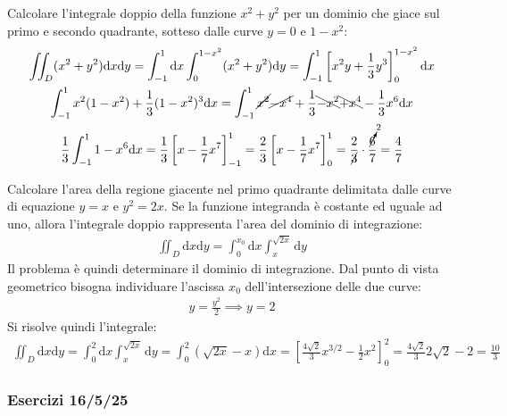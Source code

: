 \documentclass{article}
\newcommand{\df}{\mathrm{d}}
\numberwithin{equation}{subsection}
\begin{document}
Calcolare l'integrale doppio della funzione $x^2+y^2$ per un dominio che giace sul primo e secondo quadrante, sotteso dalle curve $y=0$ e $1-x^2$:
\begin{gather*}
    \iint_D(x^2+y^2)\df x\df y=\int_{-1}^1\df x\int_0^{1-x^2}(x^2+y^2)\df y=\int_{-1}^1\left[x^2y+\frac{1}{3}y^3\right]_0^{1-x^2}\df x\\
    \int_{-1}^1x^2(1-x^2)+\frac{1}{3}(1-x^2)^3\df x=
    \int_{-1}^1\cancel{x^2}\cancel{-x^4}+\frac{1}{3}\bcancel{-x^2}\bcancel{+x^4}-\frac{1}{3}x^6\df x\\
    \frac{1}{3}\int_{-1}^11-x^6\df x=\frac{1}{3}\left[x-\frac{1}{7}x^7\right]_{-1}^1=\frac{2}{3}\left[x-\frac{1}{7}x^7\right]_0^1=\frac{2}{\cancel{3}}\cdot\frac{\cancelto{2}{6}}{7}=\frac{4}{7}
\end{gather*}


Calcolare l'area della regione giacente nel primo quadrante delimitata dalle curve di equazione $y=x$ e $y^2=2x$. Se la funzione integranda è costante ed uguale ad uno, allora l'integrale doppio rappresenta l'area del dominio di integrazione:
\begin{gather*}
    \iint_D\df x\df y=\int_0^{x_0}\df x\int_x^{\sqrt{2x}}\df y
\end{gather*}
Il problema è quindi determinare il dominio di integrazione. Dal punto di vista geometrico bisogna individuare l'ascissa $x_0$ dell'intersezione delle due curve:
\begin{gather*}
    y=\frac{y^2}{2}\implies y=2
\end{gather*}
Si risolve quindi l'integrale:
\begin{gather*}
    \iint_D\df x\df y=\int_0^2\df x\int_x^{\sqrt{2x}}\df y=\int_0^2(\sqrt{2x}-x)\df x=
    \left[\frac{4\sqrt{2}}{3}x^{3/2}-\frac{1}{2}x^2\right]_0^2=\frac{4\sqrt{2}}{3}2\sqrt{2}-2=\frac{10}{3}
\end{gather*}

\subsubsection*{Esercizi 16/5/25}
\end{document}
